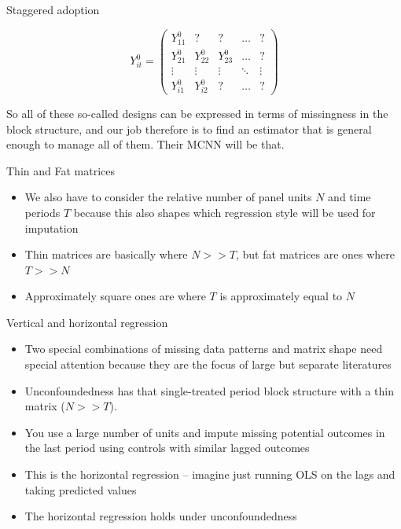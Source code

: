 \documentclass{beamer}
\begin{document}
\begin{frame}{Staggered adoption}

\begin{center}
\[ Y^0_{it}  =\begin{pmatrix}
    Y^0_{11} & ? & ? & \dots  & ? \\
    Y^0_{21} & Y^0_{22} & Y^0_{23} & \dots  & ? \\
    \vdots & \vdots & \vdots & \ddots & \vdots \\
    Y^0_{i1} & Y^0_{i2} & ? & \dots  & ?
\end{pmatrix}\]
\end{center}

So all of these so-called designs can be expressed in terms of missingness in the block structure, and our job therefore is to find an estimator that is general enough to manage all of them.  Their MCNN will be that.

\end{frame}


\begin{frame}{Thin and Fat matrices}

\begin{itemize}
\item We also have to consider the relative number of panel units $N$ and time periods $T$ because this also shapes which regression style will be used for imputation
\item Thin matrices are basically where $N>>T$, but fat matrices are ones where $T>>N$
\item Approximately square ones are where $T$ is approximately equal to $N$
\end{itemize}

\end{frame}


\begin{frame}{Vertical and horizontal regression}

\begin{itemize}
\item Two special combinations of missing data patterns and matrix shape need special attention because they are the focus of large but separate literatures
\item Unconfoundedness has that single-treated period block structure with a thin matrix ($N>>T$). 
\item You use a large number of units and impute missing potential outcomes in the last period using controls with similar lagged outcomes
\item This is the horizontal regression -- imagine just running OLS on the lags and taking predicted values
\item The horizontal regression holds under unconfoundedness
\end{itemize}

\end{frame}
\end{document}
